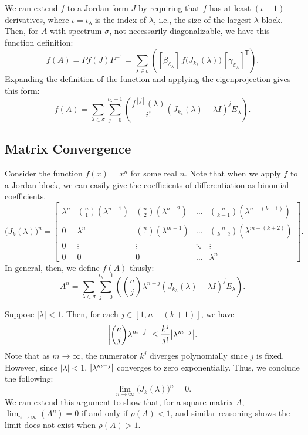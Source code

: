 \documentclass[11pt,letterpaper]{amsart}
\newcommand{\transpose}[1]{#1^{\mathsf{T}}}
\newcommand{\inverse}[1]{#1^{-1}}
\newcommand{\parens}[1]{ \left( #1 \right) }
\DeclarePairedDelimiter{\abs}{\lvert}{\rvert}
\begin{document}
We can extend $f$ to a Jordan form $J$ by requiring that $f$ has at least
$(\iota - 1)$ derivatives, where $\iota = \iota_\lambda$ is the index of
$\lambda$, i.e., the size of the largest $\lambda$-block. Then, for $A$ with
spectrum $\sigma$, not necessarily diagonalizable, we have this function
definition:
\begin{equation*}
  f(A) = P f(J) \inverse{P} = \sum_{\lambda \in \sigma}\parens{ [\beta_{\mathcal{E}_\lambda}]\, f\big( J_{k_\lambda}(\lambda) \big)\, \transpose{[\gamma_{\mathcal{E}_\lambda}]} }.
\end{equation*}
Expanding the definition of the function and applying the eigenprojection gives
this form:
\begin{equation}
  f(A) = \sum_{\lambda \in \sigma}\sum_{j=0}^{\iota_{\lambda} - 1}\parens{ \frac{f^{[j]}(\lambda)}{i!} (J_{k_\lambda}(\lambda) - \lambda I)^j E_{\lambda} }.
\end{equation}


\subsection{Matrix Convergence}
Consider the function $f(x) = x^n$ for some real $n$. Note that when we apply
$f$ to a Jordan block, we can easily give the coefficients of differentiation as
binomial coefficients.
\begin{equation}\label{eq:power_jordan_block}
  \big( J_k(\lambda) \big)^n =
  \begin{bmatrix}
    \lambda^n & \binom{n}{1}(\lambda^{n-1}) & \binom{n}{2}(\lambda^{n-2}) & \ldots & \binom{n}{k-1}(\lambda^{n-(k+1)}) \\
    0 & \lambda^n & \binom{n}{1}(\lambda^{m-1}) & \ldots & \binom{n}{k-2}(\lambda^{m-(k+2)}) \\
    0 & \vdots & \vdots & \ddots & \vdots \\
    0 & 0 & 0 & \ldots & \lambda^n
  \end{bmatrix}.
\end{equation}
In general, then, we define $f(A)$ thusly:
\begin{equation}
  A^n = \sum_{\lambda \in \sigma}\sum_{j=0}^{\iota_{\lambda} - 1}\parens{ \binom{n}{j} \lambda^{n-j} (J_{k_\lambda}(\lambda) - \lambda I)^j E_{\lambda} }.
\end{equation}

Suppose $| \lambda | < 1$. Then, for each $j \in [1, n-(k+1)]$, we have
\begin{equation*}
  \abs*{\binom{n}{j}\lambda^{m-j}} \leq \frac{k^j}{j!}{\abs*{\lambda^{m-j}}}.
\end{equation*}
Note that as $m \to \infty$, the numerator $k^j$ diverges polynomially since $j$
is fixed. However, since $| \lambda | < 1$, $\abs{\lambda^{m-j}}$ converges to
zero exponentially. Thus, we conclude the following:
\begin{equation*}
  \lim_{n\to\infty}{\big( J_k(\lambda) \big)^n} = 0.
\end{equation*}
We can extend this argument to show that, for a square matrix $A$,
$\lim_{n\to\infty}{\parens{A^n}} = 0$ if and only if $\rho(A) < 1$, and similar
reasoning shows the limit does not exist when $\rho(A) > 1$.
\end{document}
